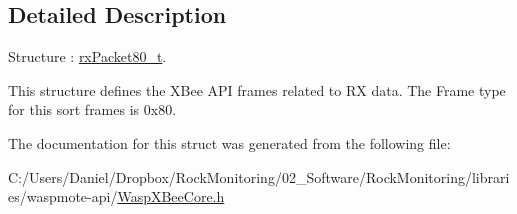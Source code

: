 \subsection{Detailed Description}
Structure \+: \hyperlink{structrx_packet80__t}{rx\+Packet80\+\_\+t}. 

This structure defines the X\+Bee A\+PI frames related to RX data. The Frame type for this sort frames is 0x80. 

The documentation for this struct was generated from the following file\+:\begin{DoxyCompactItemize}
\item 
C\+:/\+Users/\+Daniel/\+Dropbox/\+Rock\+Monitoring/02\+\_\+\+Software/\+Rock\+Monitoring/libraries/waspmote-\/api/\hyperlink{_wasp_x_bee_core_8h}{Wasp\+X\+Bee\+Core.\+h}\end{DoxyCompactItemize}
